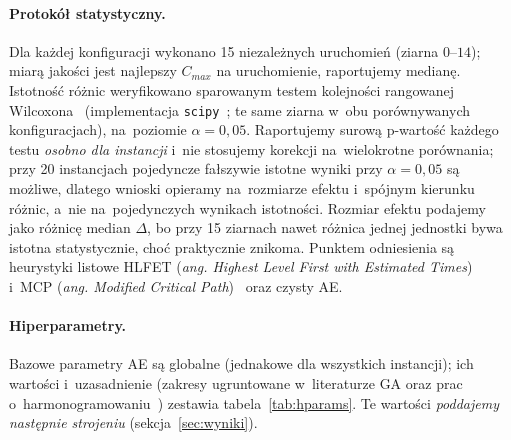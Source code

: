 \documentclass[pdflatex,sn-mathphys,Numbered]{sn-jnl}
\begin{document}
\paragraph{Protokół statystyczny.}
Dla każdej konfiguracji wykonano 15 niezależnych uruchomień (ziarna $0$--$14$);
miarą jakości jest najlepszy $C_{max}$ na uruchomienie, raportujemy medianę.
Istotność różnic weryfikowano sparowanym testem kolejności rangowanej
Wilcoxona~\cite{wilcoxon1945} (implementacja \texttt{scipy}~\cite{virtanen2020};
te same ziarna w~obu porównywanych konfiguracjach), na~poziomie $\alpha=0{,}05$.
Raportujemy surową p-wartość każdego testu \emph{osobno dla instancji} i~nie
stosujemy korekcji na~wielokrotne porównania; przy 20 instancjach pojedyncze
fałszywie istotne wyniki przy $\alpha=0{,}05$ są możliwe, dlatego wnioski opieramy
na~rozmiarze efektu i~spójnym kierunku różnic, a~nie na~pojedynczych wynikach
istotności. Rozmiar efektu podajemy jako różnicę median $\Delta$, bo przy 15
ziarnach nawet różnica jednej jednostki bywa istotna statystycznie, choć
praktycznie znikoma. Punktem odniesienia są heurystyki listowe HLFET (\textit{ang.
Highest Level First with Estimated Times})~\cite{adam1974} i~MCP (\textit{ang.
Modified Critical Path})~\cite{wu1990} oraz czysty AE.

\paragraph{Hiperparametry.}
Bazowe parametry AE są globalne (jednakowe dla wszystkich instancji); ich wartości
i~uzasadnienie (zakresy ugruntowane w~literaturze GA oraz prac
o~harmonogramowaniu~\cite{dejong1990, grefenstette1986, omara2010, hou1994})
zestawia tabela~\ref{tab:hparams}. Te wartości \emph{poddajemy następnie
strojeniu} (sekcja~\ref{sec:wyniki}).
\end{document}
